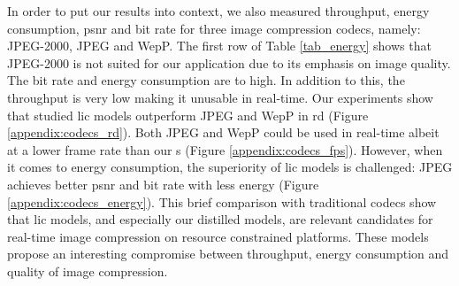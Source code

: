 In order to put our results into context, we also measured throughput, energy consumption, \acrshort{psnr} and bit rate for three image compression codecs, namely: JPEG-2000, JPEG and WepP. The first row of Table \ref{tab_energy} shows that JPEG-2000 is not suited for our application due to its emphasis on image quality. The bit rate and energy consumption are to high. In addition to this, the throughput is very low making it unusable in real-time. Our experiments show that studied \acrshort{lic} models outperform JPEG and WepP in \acrshort{rd} (Figure \ref{appendix:codecs_rd}). Both JPEG and WepP could be used in real-time albeit at a lower frame rate than our s (Figure \ref{appendix:codecs_fps}). However, when it comes to energy consumption, the superiority of \acrshort{lic} models is challenged: JPEG achieves better \acrshort{psnr} and bit rate with less energy (Figure \ref{appendix:codecs_energy}). This brief comparison with traditional codecs show that \acrshort{lic} models, and especially our distilled models, are relevant candidates for real-time image compression on resource constrained platforms. These models propose an interesting compromise between throughput, energy consumption and quality of image compression.

